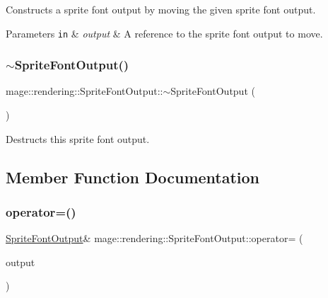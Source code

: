 Constructs a sprite font output by moving the given sprite font output.


\begin{DoxyParams}[1]{Parameters}
\mbox{\tt in}  & {\em output} & A reference to the sprite font output to move. \\
\hline
\end{DoxyParams}
\mbox{\label{structmage_1_1rendering_1_1_sprite_font_output_ac271cd1aa65291b2403555b8c230b702}} 
\subsubsection{\texorpdfstring{$\sim$\+Sprite\+Font\+Output()}{~SpriteFontOutput()}}
{\footnotesize\ttfamily mage\+::rendering\+::\+Sprite\+Font\+Output\+::$\sim$\+Sprite\+Font\+Output (\begin{DoxyParamCaption}{ }\end{DoxyParamCaption})\hspace{0.3cm}{\ttfamily [default]}}

Destructs this sprite font output. 

\subsection{Member Function Documentation}
\mbox{\label{structmage_1_1rendering_1_1_sprite_font_output_a0b94e62b46d2b75d05eff13f8909f1cc}} 
\subsubsection{\texorpdfstring{operator=()}{operator=()}\hspace{0.1cm}{\footnotesize\ttfamily [1/2]}}
{\footnotesize\ttfamily \mbox{\hyperlink{structmage_1_1rendering_1_1_sprite_font_output}{Sprite\+Font\+Output}}\& mage\+::rendering\+::\+Sprite\+Font\+Output\+::operator= (\begin{DoxyParamCaption}\item[{const \mbox{\hyperlink{structmage_1_1rendering_1_1_sprite_font_output}{Sprite\+Font\+Output}} \&}]{output }\end{DoxyParamCaption})\hspace{0.3cm}{\ttfamily [delete]}}

